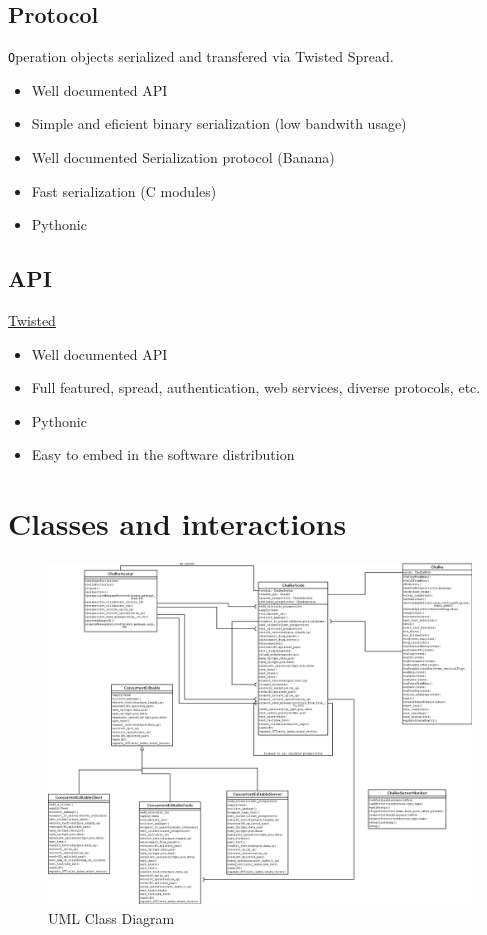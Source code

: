 \documentclass{report}
\begin{document}
\subsection{Protocol}

{\texttt Operation} objects serialized and transfered via Twisted Spread.

\begin{itemize}
\item Well documented API
\item Simple and eficient binary serialization (low bandwith usage)
\item Well documented Serialization protocol (Banana)
\item Fast serialization (C modules)
\item Pythonic
\end{itemize}

\subsection{API}
  
\href{http://www.twistedmatrix.com}{Twisted}

\begin{itemize}
\item Well documented API
\item Full featured, spread, authentication, web services, diverse protocols, etc.
\item Pythonic
\item Easy to embed in the software distribution
\end{itemize}
\section{Classes and interactions}

\begin{figure}[htbp]
 \begin{center}
    \includegraphics[angle=0,width=0.5\linewidth]{schemas/classes.png}
 \end{center}
 \caption{UML Class Diagram}
 \label{fig:umlClassDiag1}
\end{figure}
\end{document}
